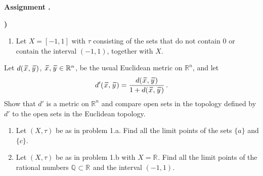 \documentclass[12pt,reqno]{amsart}
\newcounter{prob}
\newcounter{assign}
\newenvironment{assignment}{\par\noindent\textbf{Assignment \Roman{assign}.\hskip2pt}}{\par\vskip12pt\stepcounter{assign}}
\theoremstyle{plain}
\theoremstyle{definition}
\newcommand{\Q}[1]{\mathbb{Q}^{#1}}
\newcommand{\R}[1]{\mathbb{R}^{#1}}
\newcommand\conjugate[2]{\overset{\raisebox{0.0pt}{\hspace{0.2em}\text{\rule{#1}{0.2mm}}}}{#2}}
\begin{document}
\begin{assignment}
\begin{list}{\textbf{)}}{\setlength{\itemsep}{2pt}\setlength{\leftmargin}{15pt}\setlength{\parsep}{0pt}}
\begin{enumerate}[label=\textbf{\alph*})]
\item Let $X = [-1,1]$ with $\tau$ consisting of the sets that do not contain $0$ or contain the interval $(-1,1)$, together with $X$.
\end{enumerate}
\item Let $d(\conjugate{5pt}{x},\conjugate{5pt}{y})$, $\conjugate{5pt}{x}, \conjugate{5pt}{y}\in\R n$, be the usual Euclidean metric on $\R n$, and let $$d'(\conjugate{5pt}{x},\conjugate{5pt}{y})=\dfrac{d(\conjugate{5pt}{x},\conjugate{5pt}{y})}{1+d(\conjugate{5pt}{x},\conjugate{5pt}{y})}\,.$$ Show that $d'$ is a metric on $\R n$ and compare open sets in the topology defined by $d'$ to the open sets in the Euclidean topology. 
\item
\begin{enumerate}[label=\textbf{\alph*})]
\item Let $(X,\tau)$ be as in problem 1.a. Find all the limit points of the sets $\{a\}$ and $\{c\}$.
\item Let $(X,\tau)$ be as in problem 1.b with $X=\R{}$. Find all the limit points of the rational numbers $\Q{}\subset\R{}$ and the interval $(-1,1)$. 
\end{enumerate}
\end{list}
\end{assignment}
\end{document}
